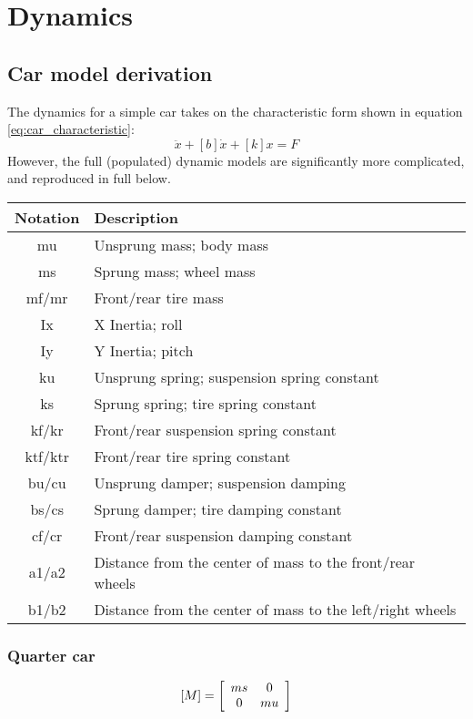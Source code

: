 \chapter{Dynamics}

\section{Car model derivation}
\label{a:dynamics}
The dynamics for a simple car takes on the characteristic form shown in equation \eqref{eq:car_characteristic}:
\begin{equation}
[M]\ddot{x}+[b]\dot{x}+[k]x=F
\end{equation}
However, the full (populated) dynamic models are significantly more complicated, and reproduced in full below.

\begin{center}
\begin{tabular}{| c | l |}
\hline
Notation & Description \\
\hline
mu & Unsprung mass; body mass \\
ms & Sprung mass; wheel mass \\
mf/mr & Front/rear tire mass \\
\hline
Ix & X Inertia; roll \\
Iy & Y Inertia; pitch \\
\hline
ku & Unsprung spring; suspension spring constant \\
ks & Sprung spring; tire spring constant \\
kf/kr & Front/rear suspension spring constant \\
ktf/ktr & Front/rear tire spring constant \\
\hline
bu/cu & Unsprung damper; suspension damping \\
bs/cs & Sprung damper; tire damping constant \\
cf/cr & Front/rear suspension damping constant \\
\hline
a1/a2 & Distance from the center of mass to the front/rear wheels \\
b1/b2 & Distance from the center of mass to the left/right wheels \\
\hline
\end{tabular}
\end{center}

\subsection{Quarter car}
\begin{equation*} \label{eq:quarter_car_m}
	[M] = \left[
		\begin{array}{c c}
		ms & 0 \\
		0 & mu \\
		\end{array}
	\right]
\end{equation*}

